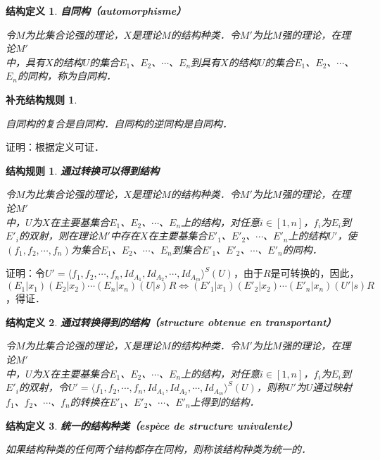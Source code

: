 \documentclass[12pt, a4paper, oneside]{book}
\newtheorem{STdef}{结构定义}
\newtheorem{CST}{结构规则}
\newtheorem{CSTcor}{补充结构规则}
\begin{document}
			\begin{STdef}
				\textbf{自同构（automorphisme）}
				\par
				令$M$为比集合论强的理论，$X$是理论$M$的结构种类．令$M'$为比$M$强的理论，在理论$M'$\\中，具有$X$的结构$U$的集合$E_1$、$E_2$、$\cdots$、$E_n$到具有$X$的结构$U$的集合$E_1$、$E_2$、$\cdots$、$E_n$的同构，称为自同构．
			\end{STdef}
			
			\begin{CSTcor}\label{CSTcor7}
				\hfill\par
				自同构的复合是自同构．自同构的逆同构是自同构．
			\end{CSTcor}
			证明：根据定义可证．
			
			\begin{CST}\label{CST5}
				\textbf{通过转换可以得到结构}
				\par
				令$M$为比集合论强的理论，$X$是理论$M$的结构种类．令$M'$为比$M$强的理论，在理论$M'$\\中，$U$为$X$在主要基集合$E_1$、$E_2$、$\cdots$、$E_n$上的结构，对任意$i\in [1, n]$，$f_i$为$E_i$到${E'}_i$的双射，则在理论$M'$中存在$X$在主要基集合${E'}_1$、${E'}_2$、$\cdots$、${E'}_n$上的结构$U'$，使$(f_1, f_2, \cdots, f_n)$为集合$E_1$、$E_2$、$\cdots$、$E_n$到集合${E'}_1$、${E'}_2$、$\cdots$、${E'}_n$的同构．
			\end{CST}
			证明：令$U'=\langle f_1, f_2, \cdots, f_n, Id_{A_1}, Id_{A_2}, \cdots, Id_{A_m}\rangle^S(U)$，由于$R$是可转换的，因此， $(E_1|x_1)(E_2|x_2)\cdots(E_n|x_n)(U|s)R\Leftrightarrow ({E'}_1|x_1)({E'}_2|x_2)\cdots({E'}_n|x_n)(U'|s)R$，得证．
						
			\begin{STdef}
				\textbf{通过转换得到的结构（structure obtenue en transportant）}
				\par
				令$M$为比集合论强的理论，$X$是理论$M$的结构种类．令$M'$为比$M$强的理论，在理论$M'$\\中，$U$为$X$在主要基集合$E_1$、$E_2$、$\cdots$、$E_n$上的结构，对任意$i\in [1, n]$，$f_i$为$E_i$到${E'}_i$的双射，令$U'=\langle f_1, f_2, \cdots, f_n, Id_{A_1}, Id_{A_2}, \cdots, Id_{A_m}\rangle^S(U)$，则称$U'$为$U$通过映射$f_1$、$f_2$、$\cdots$、$f_n$的转换在${E'}_1$、${E'}_2$、$\cdots$、${E'}_n$上得到的结构．
			\end{STdef}
			
			\begin{STdef}
				\textbf{统一的结构种类（espèce de structure univalente）}
				\par
				如果结构种类的任何两个结构都存在同构，则称该结构种类为统一的．
			\end{STdef}
						
\end{document}
